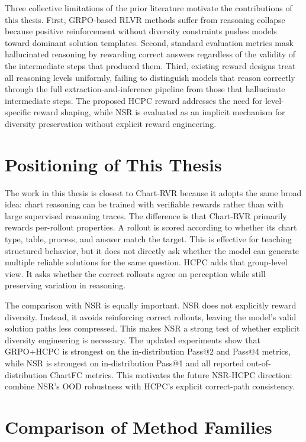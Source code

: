 \documentclass{iutbscthesis}
\begin{document}
Three collective limitations of the prior literature motivate the contributions of
this thesis. First, GRPO-based RLVR methods suffer from reasoning collapse
because positive reinforcement without diversity constraints pushes models toward
dominant solution templates. Second, standard evaluation metrics mask hallucinated
reasoning by rewarding correct answers regardless of the validity of the
intermediate steps that produced them. Third, existing reward designs treat all
reasoning levels uniformly, failing to distinguish models that reason correctly
through the full extraction-and-inference pipeline from those that hallucinate
intermediate steps. The proposed HCPC reward addresses the need for
level-specific reward shaping, while NSR is evaluated as an implicit mechanism
for diversity preservation without explicit reward engineering.
\section{Positioning of This Thesis}

The work in this thesis is closest to Chart-RVR because it adopts the same broad idea: chart reasoning can be trained with verifiable rewards rather than with large supervised reasoning traces. The difference is that Chart-RVR primarily rewards per-rollout properties. A rollout is scored according to whether its chart type, table, process, and answer match the target. This is effective for teaching structured behavior, but it does not directly ask whether the model can generate multiple reliable solutions for the same question. HCPC adds that group-level view. It asks whether the correct rollouts agree on perception while still preserving variation in reasoning.

The comparison with NSR is equally important. NSR does not explicitly reward diversity. Instead, it avoids reinforcing correct rollouts, leaving the model's valid solution paths less compressed. This makes NSR a strong test of whether explicit diversity engineering is necessary. The updated experiments show that GRPO+HCPC is strongest on the in-distribution Pass@2 and Pass@4 metrics, while NSR is strongest on in-distribution Pass@1 and all reported out-of-distribution ChartFC metrics. This motivates the future NSR-HCPC direction: combine NSR's OOD robustness with HCPC's explicit correct-path consistency.

\section{Comparison of Method Families}
\end{document}
